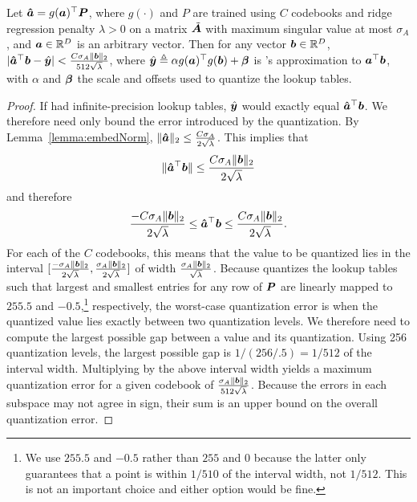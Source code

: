 \begin{lemma} \label{lemma:lutQuantBound}
Let $\ahat = g(\a)^\top\P$, where $g(\cdot)$ and $P$ are trained using $C$ codebooks and ridge regression penalty $\lambda > 0$ on a matrix $\tilde{\A}$ with maximum singular value at most $\sigma_A$, and $\a \in \R^D$ is an arbitrary vector. Then for any vector $\b \in \R^D$, $|\ahat^\top \b - \yhat| < \frac{C \sigma_A \norm{\b}_2}{512 \sqrt{\lambda}} $, where %
$\yhat \triangleq \alpha g(\a)^\top g(\b) + \mat{\beta}$ is \ours's approximation to $\a^\top \b$, with $\alpha$ and $\mat{\beta}$ the scale and offsets used to quantize the lookup tables.
\end{lemma}
\begin{proof} If \oursp had infinite-precision lookup tables, $\yhat$ would exactly equal $\ahat^\top \b$. We therefore need only bound the error introduced by the quantization. By Lemma~\ref{lemma:embedNorm}, $\norm{\ahat}_2 \le \frac{C \sigma_A}{2 \sqrt{\lambda}} $. This implies that
\begin{align}
    \norm{\ahat^\top \b} \le \frac{C \sigma_A \norm{\b}_2}{2 \sqrt{\lambda}}
\end{align}
and therefore
\begin{align}
    \frac{-C \sigma_A \norm{\b}_2}{2 \sqrt{\lambda}} \le \ahat^\top \b \le \frac{C \sigma_A \norm{\b}_2}{2 \sqrt{\lambda}}.
\end{align}
For each of the $C$ codebooks, this means that the value to be quantized lies in the interval $[\frac{-\sigma_A \norm{\b}_2}{2 \sqrt{\lambda}}, \frac{\sigma_A \norm{\b}_2}{2 \sqrt{\lambda}}]$ of width $\frac{\sigma_A \norm{\b}_2}{\sqrt{\lambda}}$.
Because \oursp quantizes the lookup tables such that largest and smallest entries for any row of $\P$ are linearly mapped to $255.5$ and $-0.5$,\footnote{We use $255.5$ and $-0.5$ rather than $255$ and $0$ because the latter only guarantees that a point is within $1 / 510$ of the interval width, not $1 / 512$. This is not an important choice and either option would be fine.} respectively, the worst-case quantization error is when the quantized value lies exactly between two quantization levels.%
We therefore need to compute the largest possible gap between a value and its quantization. Using 256 quantization levels, the largest possible gap is $1 / (256 / .5) = 1/512$ of the interval width. Multiplying by the above interval width yields a maximum quantization error for a given codebook of $\frac{\sigma_A \norm{\b}_2}{512 \sqrt{\lambda}}$.
Because the errors in each subspace may not agree in sign, their sum is an upper bound on the overall quantization error.
\end{proof}

